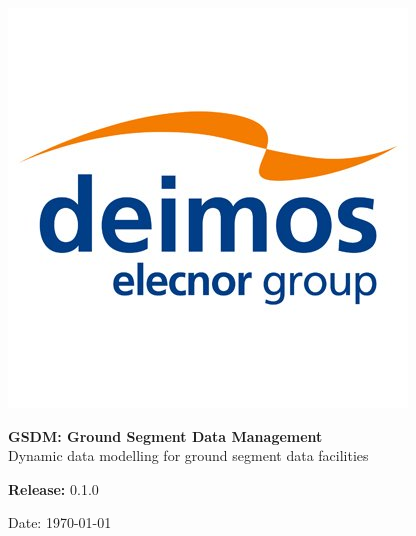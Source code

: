 %
%
%

\begin{titlepage}
	
    \includegraphics[scale=0.20]{../fig/deimos_logo.jpg} \\
    
    \vspace{2.0cm}
    
    	\begin{center}
    
    \vspace{2cm}
    
    \LARGE{\textbf{GSDM: Ground Segment Data Management}} \\    
    \LARGE{Dynamic data modelling for ground segment data facilities} \\    
    
    	\end{center}    
    
    \vspace{7.0cm}

    \vspace{0.5cm}

    \Large{\textbf{Release:} 0.1.0} \\

    \vspace{0.2cm}
    
    \large{Date: \today}
    
\end{titlepage}
